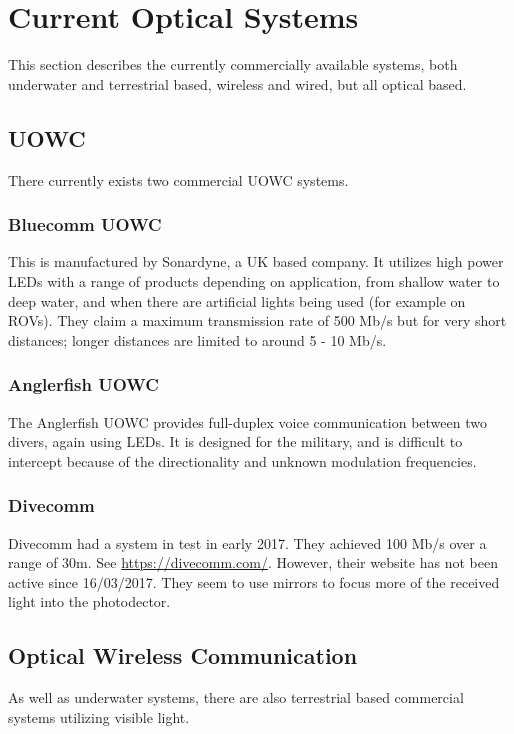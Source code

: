 \section{Current Optical Systems}
This section describes the currently commercially available systems, both
underwater and terrestrial based, wireless and wired, but all optical based.

\subsection{\ac{UOWC}}
There currently exists two commercial \ac{UOWC} systems.

\subsubsection{Bluecomm \ac{UOWC}}
This is manufactured by Sonardyne, a UK based company. It utilizes high power
\ac{LED}s with a range of products depending on application, from shallow water
to deep water, and when there are artificial lights being used (for example on
\ac{ROV}s). They claim a maximum transmission rate of 500 Mb/s but for very
short distances; longer distances are limited to around 5 - 10 Mb/s.

\subsubsection{Anglerfish \ac{UOWC}}
The Anglerfish \ac{UOWC} provides full-duplex voice communication between two
divers, again using \ac{LED}s. It is designed for the military, and is
difficult to intercept because of the directionality and unknown modulation
frequencies.

\subsubsection{Divecomm}
Divecomm had a system in test in early 2017. They achieved 100 Mb/s over
a range of 30m. See \url{https://divecomm.com/}. However, their website has
not been active since 16/03/2017. They seem to use mirrors to focus more of
the received light into the photodector.

\subsection{Optical Wireless Communication}
As well as underwater systems, there are also terrestrial based commercial
systems utilizing visible light.


